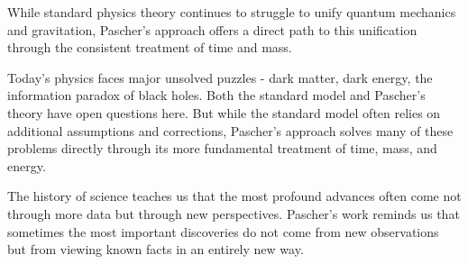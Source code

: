 \documentclass[a4paper,12pt]{article}
\begin{document}
	While standard physics theory continues to struggle to unify quantum mechanics and gravitation, Pascher's approach offers a direct path to this unification through the consistent treatment of time and mass.
	
	Today's physics faces major unsolved puzzles - dark matter, dark energy, the information paradox of black holes. Both the standard model and Pascher's theory have open questions here. But while the standard model often relies on additional assumptions and corrections, Pascher's approach solves many of these problems directly through its more fundamental treatment of time, mass, and energy.
	
	The history of science teaches us that the most profound advances often come not through more data but through new perspectives. Pascher's work reminds us that sometimes the most important discoveries do not come from new observations but from viewing known facts in an entirely new way.
	
\end{document}
